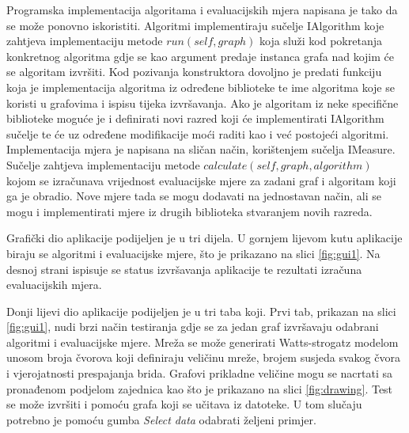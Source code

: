 \documentclass[times, utf8, diplomski]{fer}
\begin{document}
Programska implementacija algoritama i evaluacijskih mjera napisana je tako da se može ponovno iskoristiti. Algoritmi implementiraju sučelje IAlgorithm koje zahtjeva implementaciju metode $run(self, graph)$ koja služi kod pokretanja konkretnog algoritma gdje se kao argument predaje instanca grafa nad kojim će se algoritam izvršiti. Kod pozivanja konstruktora dovoljno je predati funkciju koja je implementacija algoritma iz određene biblioteke te ime algoritma koje se koristi u grafovima i ispisu tijeka izvršavanja. Ako je algoritam iz neke specifične biblioteke moguće je i definirati novi razred koji će implementirati IAlgorithm sučelje te će uz određene modifikacije moći raditi kao i već postojeći algoritmi. Implementacija mjera je napisana na sličan način, korištenjem sučelja IMeasure. Sučelje zahtjeva implementaciju metode $calculate(self, graph, algorithm)$ kojom se izračunava vrijednost evaluacijske mjere za zadani graf i algoritam koji ga je obradio. Nove mjere tada se mogu dodavati na jednostavan način, ali se mogu i implementirati mjere iz drugih biblioteka stvaranjem novih razreda.

Grafički dio aplikacije podijeljen je u tri dijela. U gornjem lijevom kutu aplikacije biraju se algoritmi i evaluacijske mjere, što je prikazano na slici \ref{fig:gui1}. Na desnoj strani ispisuje se status izvršavanja aplikacije te rezultati izračuna evaluacijskih mjera.

Donji lijevi dio aplikacije podijeljen je u tri taba koji. Prvi tab, prikazan na slici \ref{fig:gui1}, nudi brzi način testiranja gdje se za jedan graf izvršavaju odabrani algoritmi i evaluacijske mjere. Mreža se može generirati Watts-strogatz modelom unosom broja čvorova koji definiraju veličinu mreže, brojem susjeda svakog čvora i vjerojatnosti prespajanja brida. Grafovi prikladne veličine mogu se nacrtati sa pronađenom podjelom zajednica kao što je prikazano na slici \ref{fig:drawing}. Test se može izvršiti i pomoću grafa koji se učitava iz datoteke. U tom slučaju potrebno je pomoću gumba \textit{Select data} odabrati željeni primjer.
\end{document}
